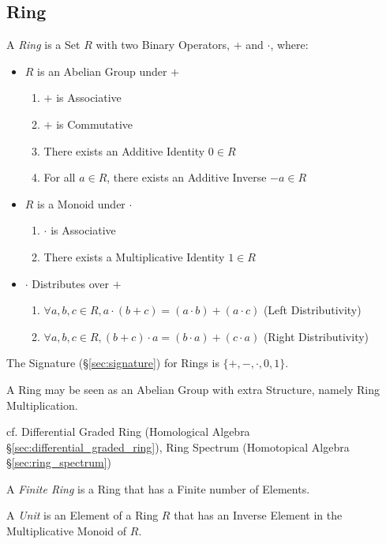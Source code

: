 \subsection{Ring}\label{sec:ring}

A \emph{Ring} is a Set $R$ with two Binary Operators, $+$ and $\cdot$, where:
\begin{itemize}
\item $R$ is an Abelian Group under $+$
    \begin{enumerate}
        \item $+$ is Associative
        \item $+$ is Commutative
        \item There exists an Additive Identity $0 \in R$
        \item For all $a \in R$, there exists an Additive Inverse $-a
          \in R$
    \end{enumerate}
\item $R$ is a Monoid under $\cdot$
    \begin{enumerate}
        \item $\cdot$ is Associative
        \item There exists a Multiplicative Identity $1 \in R$
    \end{enumerate}
\item $\cdot$ Distributes over $+$
    \begin{enumerate}
        \item $\forall a,b,c \in R,
            a \cdot (b + c) = (a \cdot b) + (a \cdot c)$
            (Left Distributivity)
        \item $\forall a,b,c \in R,
            (b + c) \cdot a = (b \cdot a) + (c \cdot a)$
            (Right Distributivity)
    \end{enumerate}
\end{itemize}
The Signature (\S\ref{sec:signature}) for Rings is $\{+, -, \cdot, 0, 1\}$.

A Ring may be seen as an Abelian Group with extra Structure, namely Ring
Multiplication.

cf. Differential Graded Ring (Homological Algebra
\S\ref{sec:differential_graded_ring}), Ring Spectrum (Homotopical Algebra
\S\ref{sec:ring_spectrum})

A \emph{Finite Ring} is a Ring that has a Finite number of Elements.

A \emph{Unit} is an Element of a Ring $R$ that has an Inverse
Element in the Multiplicative Monoid of $R$.

